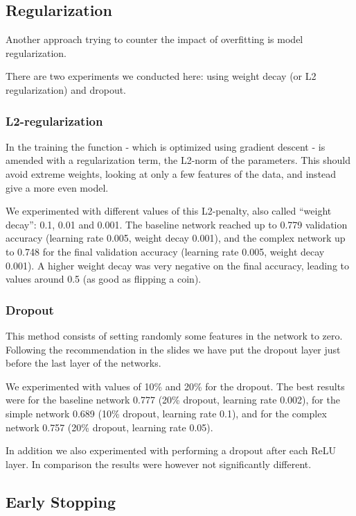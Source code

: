 \documentclass[sigconf,nonacm]{acmart}
\begin{document}
\subsection{Regularization}

Another approach trying to counter the impact of overfitting
is model regularization.

There are two experiments we conducted here:
using weight decay (or L2 regularization)
and dropout.

\subsubsection{L2-regularization}
In the training the function - which is optimized 
using gradient descent - is amended
with a regularization term, the L2-norm of the parameters.
This should avoid extreme weights, looking at only
a few features of the data, and instead give a more
even model.

We experimented with different values of this L2-penalty,
also called ``weight decay'': 0.1, 0.01 and 0.001.
The baseline network reached up to 0.779 validation
accuracy (learning rate 0.005, weight decay 0.001),
and the complex network up to 0.748 for the final
validation accuracy (learning rate 0.005, weight
decay 0.001).
A higher weight decay was very negative on the final
accuracy, leading to values around 0.5 (as good
as flipping a coin).

\subsubsection{Dropout}
This method consists
of setting randomly some features in the
network to zero.
Following the recommendation in the slides we have
put the dropout layer just before the last layer
of the networks.

We experimented with values of 10\% and 20\%
for the dropout.
The best results were for the baseline network
0.777 (20\% dropout, learning rate 0.002),
for the simple network 0.689 (10\% dropout, learning rate 0.1),
and for the complex network 0.757 (20\% dropout,
learning rate 0.05).

In addition we also experimented with performing a dropout
after each ReLU layer.
In comparison the results were however not significantly different.

\subsection{Early Stopping}
\end{document}
